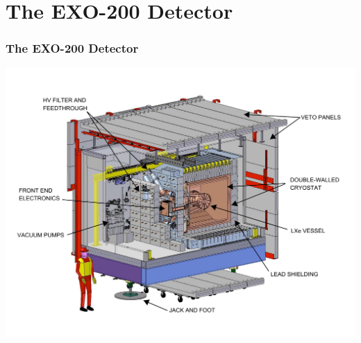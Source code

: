 \documentclass{beamer}
\begin{document}
\section{The EXO-200 Detector}

\begin{frame}
\begin{center}
\frametitle{The EXO-200 Detector}
\end{center}
\includegraphics[keepaspectratio=true,width=\textwidth]{cleanroom.pdf}
\end{frame}
\end{document}
